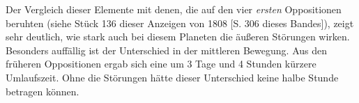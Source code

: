\par\indent Der Vergleich dieser Elemente mit denen, die auf den vier \emph{ersten} Oppositionen beruhten (siehe Stück 136 dieser Anzeigen von 1808 [S. 306 dieses Bandes]), zeigt sehr deutlich, wie stark auch bei diesem Planeten die äußeren Störungen wirken. Besonders auffällig ist der Unterschied in der mittleren Bewegung. Aus den früheren Oppositionen ergab sich eine um 3 Tage und 4 Stunden kürzere Umlaufszeit. Ohne die Störungen hätte dieser Unterschied keine halbe Stunde betragen können.
